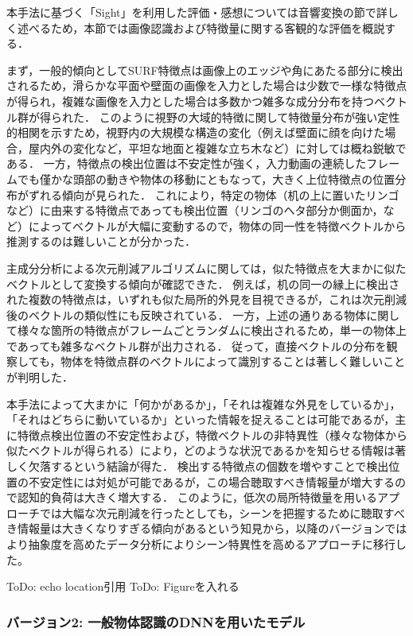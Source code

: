 本手法に基づく「Sight」を利用した評価・感想については音響変換の節で詳しく述べるため，本節では画像認識および特徴量に関する客観的な評価を概説する．

まず，一般的傾向としてSURF特徴点は画像上のエッジや角にあたる部分に検出されるため，滑らかな平面や壁面の画像を入力とした場合は少数で一様な特徴点が得られ，複雑な画像を入力とした場合は多数かつ雑多な成分分布を持つベクトル群が得られた．
このように視野の大域的特徴に関して特徴量分布が強い定性的相関を示すため，視野内の大規模な構造の変化（例えば壁面に顔を向けた場合，屋内外の変化など，平坦な地面と複雑な立ち木など）に対しては概ね鋭敏である．
一方，特徴点の検出位置は不安定性が強く，入力動画の連続したフレームでも僅かな頭部の動きや物体の移動にともなって，大きく上位特徴点の位置分布がずれる傾向が見られた．
これにより，特定の物体（机の上に置いたリンゴなど）に由来する特徴点であっても検出位置（リンゴのヘタ部分か側面か，など）によってベクトルが大幅に変動するので，物体の同一性を特徴ベクトルから推測するのは難しいことが分かった．

主成分分析による次元削減アルゴリズムに関しては，似た特徴点を大まかに似たベクトルとして変換する傾向が確認できた．
例えば，机の同一の縁上に検出された複数の特徴点は，いずれも似た局所的外見を目視できるが，これは次元削減後のベクトルの類似性にも反映されている．
一方，上述の通りある物体に関して様々な箇所の特徴点がフレームごとランダムに検出されるため，単一の物体上であっても雑多なベクトル群が出力される．
従って，直接ベクトルの分布を観察しても，物体を特徴点群のベクトルによって識別することは著しく難しいことが判明した．

本手法によって大まかに「何かがあるか」，「それは複雑な外見をしているか」，「それはどちらに動いているか」といった情報を捉えることは可能であるが，主に特徴点検出位置の不安定性および，特徴ベクトルの非特異性（様々な物体から似たベクトルが得られる）により，どのような状況であるかを知らせる情報は著しく欠落するという結論が得た．
検出する特徴点の個数を増やすことで検出位置の不安定性には対処が可能であるが，この場合聴取すべき情報量が増大するので認知的負荷は大きく増大する．
このように，低次の局所特徴量を用いるアプローチでは大幅な次元削減を行ったとしても，シーンを把握するために聴取すべき情報量は大きくなりすぎる傾向があるという知見から，以降のバージョンではより抽象度を高めたデータ分析によりシーン特異性を高めるアプローチに移行した。

ToDo: echo location引用
ToDo: Figureを入れる


\subsubsection{バージョン2: 一般物体認識のDNNを用いたモデル}

